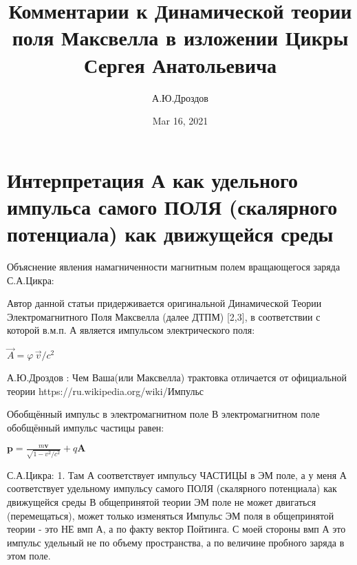 \documentclass{article}
\begin{document}
\title{Комментарии к Динамической теории поля Максвелла в изложении Цикры Сергея  Анатольевича}

\author{А.Ю.Дроздов}

\date{Mar 16, 2021}


\begin{titlepage}
\maketitle
\end{titlepage}


\section{Интерпретация А как удельного импульса самого ПОЛЯ (скалярного потенциала) как движущейся среды}

Объяснение явления намагниченности магнитным полем вращающегося заряда
С.А.Цикра:

Автор данной статьи придерживается оригинальной Динамической Теории Электромагнитного Поля Максвелла (далее ДТПМ) [2,3], в соответствии с которой  в.м.п. А является импульсом электрического поля:

$\vec{A} = \varphi\,\vec{v}/c^2$

А.Ю.Дроздов : Чем Ваша(или Максвелла)  трактовка отличается от официальной теории
https://ru.wikipedia.org/wiki/Импульс

Обобщённый импульс в электромагнитном поле
В электромагнитном поле обобщённый импульс частицы равен:

${\mathbf  {p}}={\frac  {m{\mathbf  {v}}}{{\sqrt  {1-v^{2}/c^{2}}}}}+q{\mathbf  A}$




С.А.Цикра: 1. Там А соответствует импульсу ЧАСТИЦЫ в ЭМ поле, а у меня А соответствует удельному импульсу самого ПОЛЯ (скалярного потенциала) как движущейся среды
В общепринятой теории ЭМ поле не может двигаться (перемещаться), может только изменяться
Импульс ЭМ поля в общепринятой теории - это НЕ вмп А, а по факту вектор Пойтинга.
С моей стороны вмп А это импульс удельный не по объему пространства, а по величине пробного заряда в этом поле.
\end{document}
